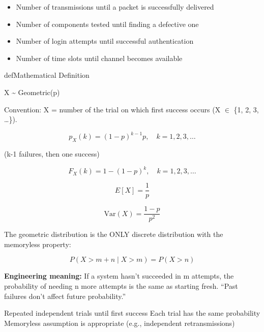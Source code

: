 
\begin{itemize}
\tightlist
\item
  Number of transmissions until a packet is successfully delivered
\item
  Number of components tested until finding a defective one
\item
  Number of login attempts until successful authentication
\item
  Number of time slots until channel becomes available
\end{itemize}

\begin{PSbox}[unbreakable]{def}{Mathematical Definition}

X \textasciitilde{} Geometric(p)

Convention: X = number of the trial on which first success occurs (X \ensuremath{\in} \{1, 2, 3, …\}).

\end{PSbox}


\[p_X(k) = (1-p)^{k-1} p, \quad k = 1, 2, 3, \ldots\]

(k-1 failures, then one success)


\[F_X(k) = 1 - (1-p)^k, \quad k = 1, 2, 3, \ldots\]


\[E[X] = \frac{1}{p}\]


\[\text{Var}(X) = \frac{1-p}{p^2}\]


The geometric distribution is the ONLY discrete distribution with the memoryless property:

\[P(X > m + n \mid X > m) = P(X > n)\]

\textbf{Engineering meaning:} If a system hasn’t succeeded in m attempts, the probability of needing n more attempts is the same as starting fresh. ``Past failures don’t affect future probability.''


\PSyes{} Repeated independent trials until first success\PSbr{}\PSyes{} Each trial has the same probability\PSbr{}\PSyes{} Memoryless assumption is appropriate (e.g., independent retransmissions)


